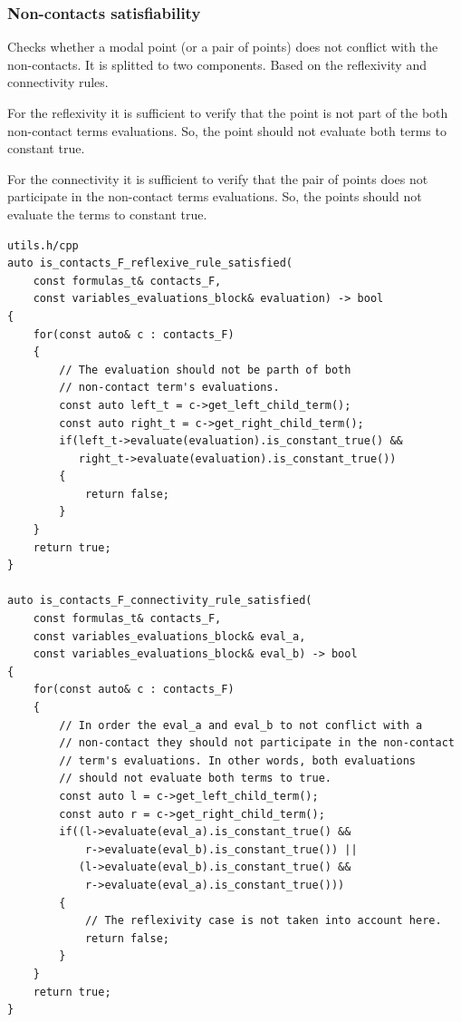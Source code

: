\documentclass{article}
\begin{document}
	\newpage
	\subsubsection*{Non-contacts satisfiability}
	Checks whether a modal point (or a pair of points) does not conflict with the non-contacts. It is splitted to two components. Based on the reflexivity and connectivity rules.

	For the reflexivity it is sufficient to verify that the point is not part of the both non-contact terms evaluations. So, the point should not evaluate both terms to constant true.

	For the connectivity it is sufficient to verify that the pair of points does not participate in the non-contact terms evaluations. So, the points should not evaluate the terms to constant true.
\begin{lstlisting}
utils.h/cpp
auto is_contacts_F_reflexive_rule_satisfied(
	const formulas_t& contacts_F,
	const variables_evaluations_block& evaluation) -> bool
{
    for(const auto& c : contacts_F)
    {
        // The evaluation should not be parth of both
        // non-contact term's evaluations.
        const auto left_t = c->get_left_child_term();
        const auto right_t = c->get_right_child_term();
        if(left_t->evaluate(evaluation).is_constant_true() &&
           right_t->evaluate(evaluation).is_constant_true())
        {
            return false;
        }
    }
    return true;
}

auto is_contacts_F_connectivity_rule_satisfied(
	const formulas_t& contacts_F,
	const variables_evaluations_block& eval_a,
	const variables_evaluations_block& eval_b) -> bool
{
    for(const auto& c : contacts_F)
    {
        // In order the eval_a and eval_b to not conflict with a
        // non-contact they should not participate in the non-contact
        // term's evaluations. In other words, both evaluations
        // should not evaluate both terms to true.
        const auto l = c->get_left_child_term();
        const auto r = c->get_right_child_term();
        if((l->evaluate(eval_a).is_constant_true() &&
            r->evaluate(eval_b).is_constant_true()) ||
           (l->evaluate(eval_b).is_constant_true() &&
            r->evaluate(eval_a).is_constant_true()))
        {
            // The reflexivity case is not taken into account here.
            return false;
        }
    }
    return true;
}

\end{lstlisting}
\end{document}
